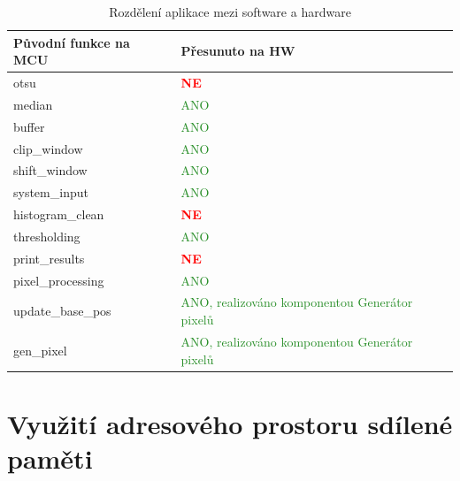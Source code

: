 \documentclass[12pt,a4paper,titlepage,final]{report}
\begin{document}
\begin{table}[h!]
	\begin{center}
    \begin{tabular}{ | p{3cm} | p{6cm} |}
    \hline
    Původní funkce na MCU & Přesunuto na HW
    \\ \hline
    
   	otsu & \textcolor{red}{\textbf{NE}}	
	\\ \hline
	median & \textcolor{ForestGreen}{ANO}
	\\ \hline
	buffer & \textcolor{ForestGreen}{ANO}
	\\ \hline
	clip\_window & \textcolor{ForestGreen}{ANO}
	\\ \hline
	shift\_window & \textcolor{ForestGreen}{ANO}
	\\ \hline
	system\_input & \textcolor{ForestGreen}{ANO}
	\\ \hline
	histogram\_clean & \textcolor{red}{\textbf{NE}}
	\\ \hline
	thresholding & \textcolor{ForestGreen}{ANO}
	\\ \hline
	print\_results & \textcolor{red}{\textbf{NE}}
	\\ \hline
	pixel\_processing & \textcolor{ForestGreen}{ANO}
	\\ \hline
	update\_base\_pos & \textcolor{ForestGreen}{ANO, realizováno komponentou Generátor pixelů}
	\\ \hline
	gen\_pixel & \textcolor{ForestGreen}{ANO, realizováno komponentou Generátor pixelů}
	\\ \hline
    	
	
    \end{tabular}
	\end{center}	
	\caption{Rozdělení aplikace mezi software a hardware}  
\end{table}
	


\section{Využití adresového prostoru sdílené paměti}
\end{document}
